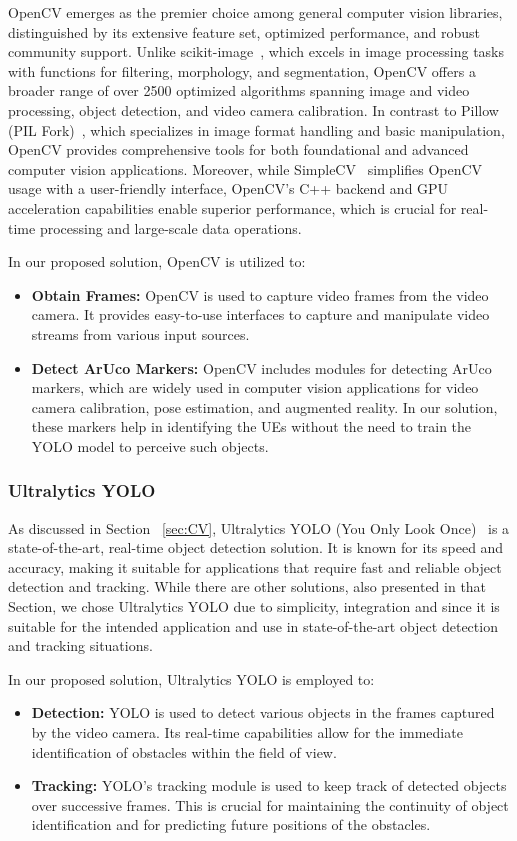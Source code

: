 OpenCV emerges as the premier choice among general computer vision libraries, distinguished by its extensive feature set, optimized performance, and robust community support.
Unlike scikit-image~\cite{Scikit-learn}, which excels in image processing tasks with functions for filtering, morphology, and segmentation, OpenCV offers a broader range of over 2500 optimized algorithms spanning image and video processing, object detection, and video camera calibration.
In contrast to Pillow (PIL Fork)~\cite{pillow}, which specializes in image format handling and basic manipulation, OpenCV provides comprehensive tools for both foundational and advanced computer vision applications.
Moreover, while SimpleCV~\cite{simplecv} simplifies OpenCV usage with a user-friendly interface, OpenCV's C++ backend and GPU acceleration capabilities enable superior performance, which is crucial for real-time processing and large-scale data operations.

In our proposed solution, OpenCV is utilized to:
\begin{itemize}
    \item \textbf{Obtain Frames:} OpenCV is used to capture video frames from the video camera.
    It provides easy-to-use interfaces to capture and manipulate video streams from various input sources.
    \item \textbf{Detect ArUco Markers:} OpenCV includes modules for detecting ArUco markers, which are widely used in computer vision applications for video camera calibration, pose estimation, and augmented reality.
    In our solution, these markers help in identifying the UEs without the need to train the YOLO model to perceive such objects.
\end{itemize}

\subsubsection{Ultralytics YOLO}
As discussed in Section ~\ref{sec:CV}, Ultralytics YOLO (You Only Look Once)~\cite{ultralytics_docs} is a state-of-the-art, real-time object detection solution.
It is known for its speed and accuracy, making it suitable for applications that require fast and reliable object detection and tracking.
While there are other solutions, also presented in that Section, we chose Ultralytics YOLO due to simplicity, integration and since it is suitable for the intended application and use in state-of-the-art object detection and tracking situations.

In our proposed solution, Ultralytics YOLO is employed to:
\begin{itemize}
    \item \textbf{Detection:} YOLO is used to detect various objects in the frames captured by the video camera.
    Its real-time capabilities allow for the immediate identification of obstacles within the field of view.
    \item \textbf{Tracking:} YOLO’s tracking module is used to keep track of detected objects over successive frames.
    This is crucial for maintaining the continuity of object identification and for predicting future positions of the obstacles. %
\end{itemize}

